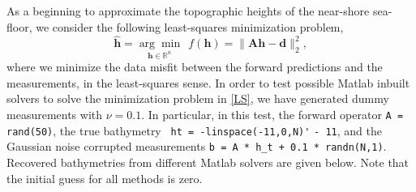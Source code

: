 As a beginning to approximate the topographic heights of the near-shore sea-floor,  we consider the following least-squares minimization problem,
\begin{equation}\label{LS}
\mathbf{\hat{h}}= \underset{\mathbf{h} \in \mathbb{R}^n}{\arg \min} \ \ f(\mathbf{h}) = \|  \mathbf{A}\mathbf{h} -  \mathbf{d} \|_2^2,
\end{equation}
where we minimize the data misfit between the forward predictions and the measurements, in the least-squares sense. In order to test possible Matlab inbuilt solvers to solve the minimization problem in  \eqref{LS}, we have generated dummy measurements with $\nu = 0.1$. In particular, in this test, the forward operator \verb|A = rand(50)|, the true bathymetry \verb| ht = -linspace(-11,0,N)'| \verb|- 11|, and the Gaussian noise corrupted measurements \verb|b = A * h_t + 0.1 * randn(N,1)|. Recovered bathymetries from different Matlab solvers are given below. Note that the initial guess for all methods is zero. 
